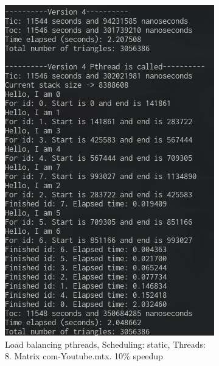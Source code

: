 \documentclass[12pt, a4paper]{article}
\begin{document}
\begin{figure}[h!]
     \begin{subfigure}[b]{0.45\textwidth}
         \centering
         \includegraphics[height=.3\textheight, width=\textwidth, keepaspectratio]{assets/load_pthreads.png}
         \caption{Load balancing pthreads, Scheduling: static, Threads: 8. Matrix com-Youtube.mtx. 10\% speedup}
     \end{subfigure}
     \hfill
     \begin{subfigure}[b]{0.45\textwidth}
         \centering

\end{subfigure}
\end{figure}
\end{document}

